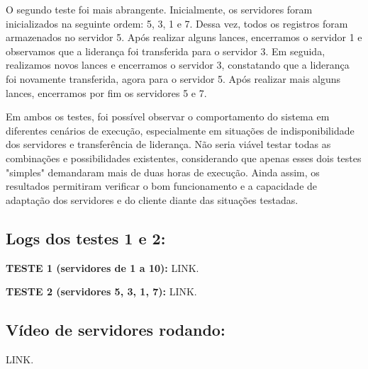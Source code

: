 O segundo teste foi mais abrangente. Inicialmente, os servidores foram inicializados na seguinte ordem: 5, 3, 1 e 7. Dessa vez, todos os registros foram armazenados no servidor 5. Após realizar alguns lances, encerramos o servidor 1 e observamos que a liderança foi transferida para o servidor 3. Em seguida, realizamos novos lances e encerramos o servidor 3, constatando que a liderança foi novamente transferida, agora para o servidor 5. Após realizar mais alguns lances, encerramos por fim os servidores 5 e 7.

Em ambos os testes, foi possível observar o comportamento do sistema em diferentes cenários de execução, especialmente em situações de indisponibilidade dos servidores e transferência de liderança. Não seria viável testar todas as combinações e possibilidades existentes, considerando que apenas esses dois testes "simples" demandaram mais de duas horas de execução. Ainda assim, os resultados permitiram verificar o bom funcionamento e a capacidade de adaptação dos servidores e do cliente diante das situações testadas.

\subsection*{Logs dos testes 1 e 2:}

\textbf{TESTE 1 (servidores de 1 a 10):} LINK.

\textbf{TESTE 2 (servidores 5, 3, 1, 7):} LINK.

\subsection*{Vídeo de servidores rodando:} LINK.







